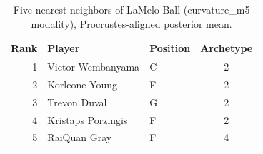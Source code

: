 \begin{table}[htbp]
  \centering\small
  \begin{tabular}{rllc}
    \toprule
    Rank & Player & Position & Archetype \\
    \midrule
    1 & Victor Wembanyama & C & 2 \\
    2 & Korleone Young & F & 2 \\
    3 & Trevon Duval & G & 2 \\
    4 & Kristaps Porzingis & F & 2 \\
    5 & RaiQuan Gray & F & 4 \\
    \bottomrule
  \end{tabular}
  \caption{Five nearest neighbors of LaMelo Ball (curvature_m5 modality), Procrustes-aligned posterior mean.}
  \label{tab:LaMelo_Ball_neighbors_curvature_m5}
\end{table}

